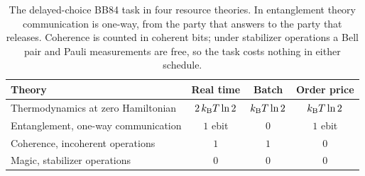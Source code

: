 \begin{table}[tbp]
\centering
\small
\begin{tabular}{lccc}
\toprule
Theory & Real time & Batch & Order price\\
\midrule
Thermodynamics at zero Hamiltonian & $2\,k_{\mathrm B} T\ln2$ & $k_{\mathrm B} T\ln2$ & $k_{\mathrm B} T\ln2$\\
Entanglement, one-way communication & $1$ ebit & $0$ & $1$ ebit\\
Coherence, incoherent operations & $1$ & $1$ & $0$\\
Magic, stabilizer operations & $0$ & $0$ & $0$\\
\bottomrule
\end{tabular}
\caption{The delayed-choice BB84 task in four resource theories. In entanglement theory communication is one-way, from the party that answers to the party that releases. Coherence is counted in coherent bits; under stabilizer operations a Bell pair and Pauli measurements are free, so the task costs nothing in either schedule.}\label{to:tab:currency}
\end{table}

